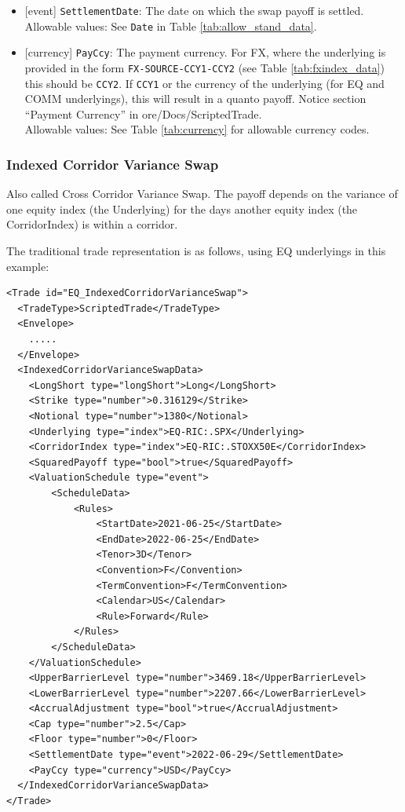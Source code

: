 \begin{itemize}
  \item{}[event] \lstinline!SettlementDate!: The date on which the swap payoff is settled. \\
  Allowable values: See \lstinline!Date! in Table \ref{tab:allow_stand_data}.
  \item{}[currency] \lstinline!PayCcy!: The payment currency. For FX, where the underlying is provided
      in the form \lstinline!FX-SOURCE-CCY1-CCY2! (see Table \ref{tab:fxindex_data}) this should
      be \lstinline!CCY2!. If \lstinline!CCY1! or the currency of the underlying (for EQ and
      COMM underlyings), this will result in a quanto payoff. Notice section ``Payment Currency'' in ore/Docs/ScriptedTrade. \\
        Allowable values: See Table \ref{tab:currency}  for allowable currency codes.
\end{itemize}

\subsubsection{Indexed Corridor Variance Swap}

Also called Cross Corridor Variance Swap. The payoff depends on the variance of one equity index (the Underlying) for the days another
equity index (the CorridorIndex) is within a corridor.

The traditional trade representation is as follows, using EQ underlyings in this example:

\begin{verbatim}
<Trade id="EQ_IndexedCorridorVarianceSwap">
  <TradeType>ScriptedTrade</TradeType>
  <Envelope>
    .....
  </Envelope>
  <IndexedCorridorVarianceSwapData>
    <LongShort type="longShort">Long</LongShort>
    <Strike type="number">0.316129</Strike>
    <Notional type="number">1380</Notional>
    <Underlying type="index">EQ-RIC:.SPX</Underlying>
    <CorridorIndex type="index">EQ-RIC:.STOXX50E</CorridorIndex>
    <SquaredPayoff type="bool">true</SquaredPayoff>
    <ValuationSchedule type="event">
        <ScheduleData>
            <Rules>
                <StartDate>2021-06-25</StartDate>
                <EndDate>2022-06-25</EndDate>
                <Tenor>3D</Tenor>
                <Convention>F</Convention>
                <TermConvention>F</TermConvention>
                <Calendar>US</Calendar>
                <Rule>Forward</Rule>
            </Rules>
        </ScheduleData>
    </ValuationSchedule>
    <UpperBarrierLevel type="number">3469.18</UpperBarrierLevel>
    <LowerBarrierLevel type="number">2207.66</LowerBarrierLevel>
    <AccrualAdjustment type="bool">true</AccrualAdjustment>
    <Cap type="number">2.5</Cap>
    <Floor type="number">0</Floor>
    <SettlementDate type="event">2022-06-29</SettlementDate>
    <PayCcy type="currency">USD</PayCcy>
  </IndexedCorridorVarianceSwapData>
</Trade>
\end{verbatim}

